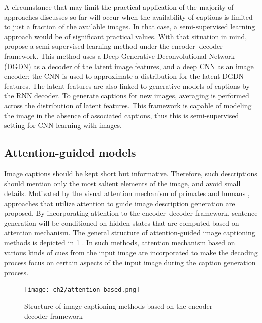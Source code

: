 A circumstance that may limit the practical application of the majority of approaches discusses so far will occur when the availability of captions is limited to just a fraction of the available images. In that case, a semi-supervised learning approach would be of significant practical values. With that situation in mind, \citet{Pu2016_VAE} propose a semi-supervised learning method under the encoder–decoder framework. This method uses a Deep Generative Deconvolutional Network (DGDN) \citep{Pu2016_DGDN} as a decoder of the latent image features, and a deep CNN as an image encoder; the CNN is used to approximate a distribution for the latent DGDN features. The latent features are also linked to generative models of captions by the RNN decoder. To generate captions for new images, averaging is performed across the distribution of latent features. This framework is capable of modeling the image in the absence of associated captions, thus this is semi-supervised setting for CNN learning with images. 

\subsection{Attention-guided models}\label{sec:attention-guided_models}

Image captions should be kept short but informative. Therefore, such descriptions should mention only the most salient elements of the image, and avoid small details. Motivated by the visual attention mechanism of primates and humans \citep{Rensink2000, Spratling2004} , approaches that utilize attention to guide image description generation are proposed. By incorporating attention to the encoder–decoder framework, sentence generation will be conditioned on hidden states that are computed based on attention mechanism. The general structure of attention-guided image captioning methods is depicted in \cref{fig:attention-based} . In such methods, attention mechanism based on various kinds of cues from the input image are incorporated to make the decoding process focus on certain aspects of the input image during the caption generation process.

\begin{figure}[hpt]
	\centering
	\texttt{[image: ch2/attention-based.png]}
	\caption{Structure of image captioning methods based on the encoder-decoder framework}
	\label{fig:attention-based}
\end{figure}

